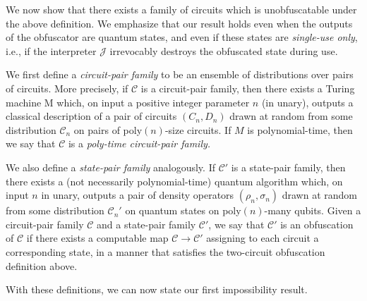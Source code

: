 \documentclass[envcountsame]{llncs}
\numberwithin{equation}{section}
\begin{document}
We now show that there exists a family of circuits which is unobfuscatable under the above definition. We emphasize that our result holds even when the outputs of the obfuscator are quantum states, and even if these states are \emph{single-use only}, i.e., if the interpreter $\mathcal J$ irrevocably destroys the obfuscated state during use. 

We first define a \emph{circuit-pair family} to be an ensemble of distributions over pairs of circuits. More precisely, if $\mathcal C$ is a circuit-pair family, then there exists a Turing machine M which, on input a positive integer parameter $n$ (in unary), outputs a classical description of a pair of circuits $(C_n, D_n)$ drawn at random from some distribution $\mathcal C_n$ on pairs of poly$(n)$-size circuits. If $M$ is polynomial-time, then we say that $\mathcal C$ is a \emph{poly-time circuit-pair family.}

We also define a \emph{state-pair family} analogously. If $\mathcal C'$ is a state-pair family, then there exists a (not necessarily polynomial-time) quantum algorithm which, on input $n$ in unary, outputs a pair of density operators $(\rho_n, \sigma_n)$ drawn at random from some distribution $\mathcal C_n'$ on quantum states on poly$(n)$-many qubits. Given a circuit-pair family $\mathcal C$ and a state-pair family $\mathcal C'$, we say that $\mathcal C'$ is an obfuscation of $\mathcal C$ if there exists a computable map $\mathcal C \rightarrow \mathcal C'$ assigning to each circuit a corresponding state, in a manner that satisfies the two-circuit obfuscation definition above.

With these definitions, we can now state our first impossibility result.
\end{document}

